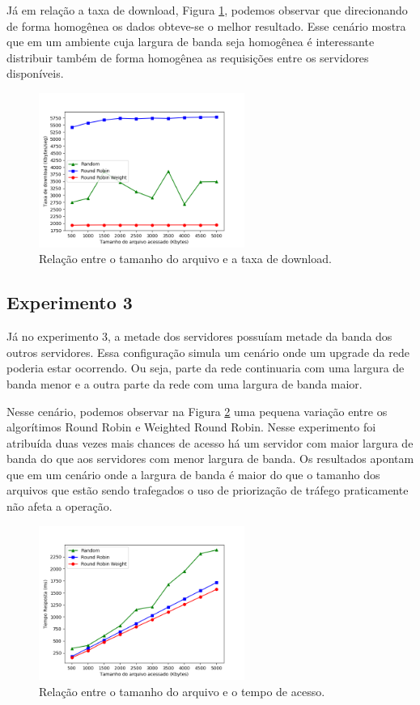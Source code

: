 \documentclass[12pt]{article}
\begin{document}
Já em relação a taxa de download, Figura \ref{fig:exp2_b}, podemos observar que direcionando de forma homogênea os dados obteve-se o melhor resultado. Esse cenário mostra que em um ambiente cuja largura de banda seja homogênea é interessante distribuir também de forma homogênea as requisições entre os servidores disponíveis.

\begin{figure}[ht]
\centering
\includegraphics[width=0.6\textwidth]{images/exp2_banda.png}
\caption{Relação entre o tamanho do arquivo e a taxa de download.}
\label{fig:exp2_b}
\end{figure}

\subsection{Experimento 3}

Já no experimento 3, a metade dos servidores possuíam metade da banda dos outros servidores. Essa configuração simula um cenário onde um upgrade da rede poderia estar ocorrendo. Ou seja, parte da rede continuaria com uma largura de banda menor e a outra parte da rede com uma largura de banda maior. 

Nesse cenário, podemos observar na Figura \ref{fig:exp3_t} uma pequena variação entre os algorítimos Round Robin e Weighted Round Robin. Nesse experimento foi atribuída duas vezes mais chances de acesso há um servidor com maior largura de banda do que aos servidores com menor largura de banda. Os resultados apontam que em um cenário onde a largura de banda é maior do que o tamanho dos arquivos que estão sendo trafegados o uso de priorização de tráfego praticamente não afeta a operação.

\begin{figure}[ht]
\centering
\includegraphics[width=0.6\textwidth]{images/exp3_time.png}
\caption{Relação entre o tamanho do arquivo e o tempo de acesso.}
\label{fig:exp3_t}
\end{figure}
\end{document}

